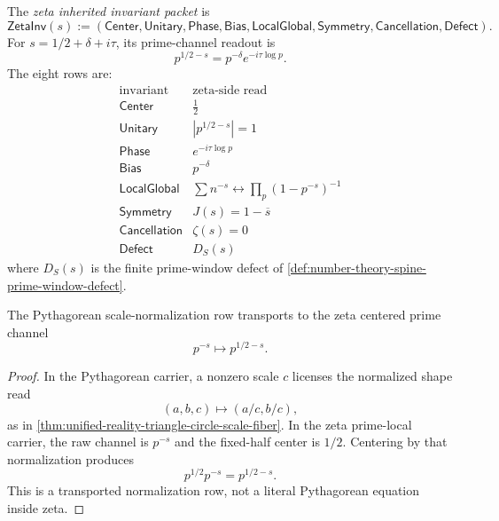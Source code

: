 \begin{definition}
\label{def:unified-reality-zeta-inherited-invariant-packet}
The \emph{zeta inherited invariant packet} is
$$
\mathsf{ZetaInv}(s)
:=
(
\mathsf{Center},
\mathsf{Unitary},
\mathsf{Phase},
\mathsf{Bias},
\mathsf{LocalGlobal},
\mathsf{Symmetry},
\mathsf{Cancellation},
\mathsf{Defect}
).
$$
For $s=1/2+\delta+i\tau$, its prime-channel readout is
$$
p^{1/2-s}=p^{-\delta}e^{-i\tau\log p}.
$$
The eight rows are:
$$
\begin{array}{c|c}
\text{invariant} & \text{zeta-side read}\\
\hline
\mathsf{Center} & \frac12\\
\mathsf{Unitary} & |p^{1/2-s}|=1\\
\mathsf{Phase} & e^{-i\tau\log p}\\
\mathsf{Bias} & p^{-\delta}\\
\mathsf{LocalGlobal} & \sum n^{-s}\leftrightarrow\prod_p(1-p^{-s})^{-1}\\
\mathsf{Symmetry} & J(s)=1-\overline{s}\\
\mathsf{Cancellation} & \zeta(s)=0\\
\mathsf{Defect} & D_S(s)
\end{array}
$$
where $D_S(s)$ is the finite prime-window defect of
\autoref{def:number-theory-spine-prime-window-defect}.
\end{definition}

\begin{theorem}
\label{thm:unified-reality-zeta-centered-prime-channel}
The Pythagorean scale-normalization row transports to the zeta centered
prime channel
$$
p^{-s}\mapsto p^{1/2-s}.
$$
\end{theorem}

\begin{proof}
In the Pythagorean carrier, a nonzero scale $c$ licenses the normalized
shape read
$$
(a,b,c)\mapsto(a/c,b/c),
$$
as in
\autoref{thm:unified-reality-triangle-circle-scale-fiber}. In the zeta
prime-local carrier, the raw channel is $p^{-s}$ and the fixed-half
center is $1/2$. Centering by that normalization produces
$$
p^{1/2}p^{-s}=p^{1/2-s}.
$$
This is a transported normalization row, not a literal Pythagorean
equation inside zeta.
\end{proof}

